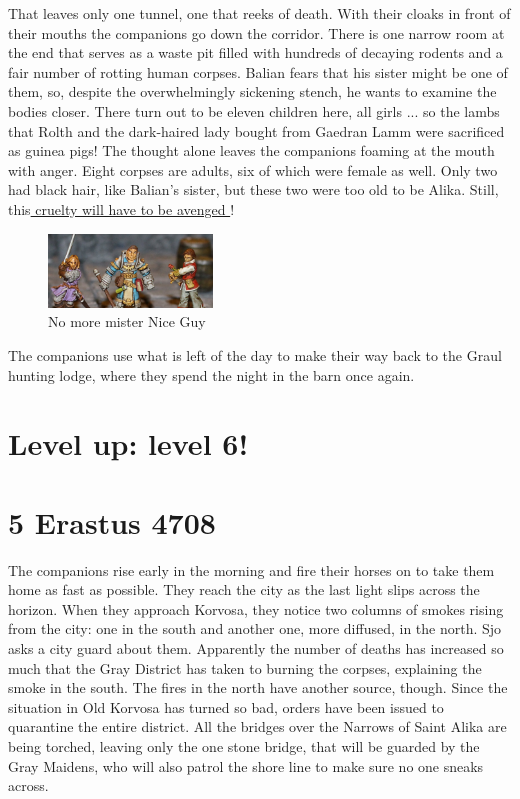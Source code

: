 That leaves only one tunnel, one that reeks of death. With their cloaks in front of their mouths the companions go down the corridor. There is one narrow room at the end that serves as a waste pit filled with hundreds of decaying rodents and a fair number of rotting human corpses. Balian fears that his sister might be one of them, so, despite the overwhelmingly sickening stench, he wants to examine the bodies closer. There turn out to be eleven children here, all girls ... so the lambs that Rolth and the dark-haired lady bought from Gaedran Lamm were sacrificed as guinea pigs! The thought alone leaves the companions foaming at the mouth with anger. Eight corpses are adults, six of which were female as well. Only two had black hair, like Balian's sister, but these two were too old to be Alika. Still, this\hyperref[fig:No-more-mister-Nice-Guy-515533807]{ cruelty will have to be avenged } ! \\

\begin{figure}[h]
	\centering
	\includegraphics[width=0.39\textwidth]{images/No-more-mister-Nice-Guy-515533807.jpg}
	\caption{No more mister Nice Guy}
	\label{fig:No-more-mister-Nice-Guy-515533807}
\end{figure}

The companions use what is left of the day to make their way back to the Graul hunting lodge, where they spend the night in the barn once again.\\

\section{Level up: level 6!}

\section{5 Erastus 4708}

The companions rise early in the morning and fire their horses on to take them home as fast as possible. They reach the city as the last light slips across the horizon. When they approach Korvosa, they notice two columns of smokes rising from the city: one in the south and another one, more diffused, in the north. Sjo asks a city guard about them. Apparently the number of deaths has increased so much that the Gray District has taken to burning the corpses, explaining the smoke in the south. The fires in the north have another source, though. Since the situation in Old Korvosa has turned so bad, orders have been issued to quarantine the entire district. All the bridges over the Narrows of Saint Alika are being torched, leaving only the one stone bridge, that will be guarded by the Gray Maidens, who will also patrol the shore line to make sure no one sneaks across.\\

